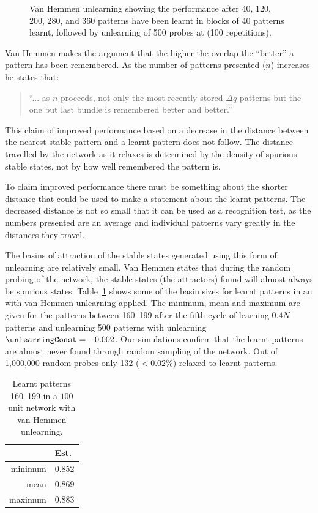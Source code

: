 \begin{figure}[tbp]
\small
\center
	
	\caption{Van Hemmen unlearning showing the performance after 40, 120, 200, 280, and 360 patterns have been learnt in blocks of 40 patterns learnt, followed by unlearning of 500 probes at  (100 repetitions).}
	\label{fig:VanHemmenUL}
\end{figure}

Van Hemmen makes the argument that the higher the overlap the ``better'' a pattern has been remembered.  As the number of patterns presented ($n$) increases he states that:
\begin{quote}
``... as $n$ proceeds, not only the most recently stored $\Delta{q}$ patterns but the one but last bundle is remembered better and better.''
\end{quote}
This claim of improved performance based on a decrease in the distance between the nearest stable pattern and a learnt pattern does not follow.  The distance travelled by the network as it relaxes is determined by the density of spurious stable states, not by how well remembered the pattern is.  

To claim improved performance there must be something about the shorter distance that could be used to make a statement about the learnt patterns.  The decreased distance is not so small that it can be used as a recognition test, as the numbers presented are an average and individual patterns vary greatly in the distances they travel.  

The basins of attraction of the stable states generated using this form of unlearning are relatively small. Van Hemmen states that during the random probing of the network, the stable states (the attractors) found will almost always be spurious states. Table~\ref{tab:vanHemmenBasin} shows some of the basin sizes for learnt patterns in an \hopnet{100\pm}{} with van Hemmen unlearning applied.  The minimum, mean and maximum are given for the patterns between 160--199 after the fifth cycle of learning $0.4N$ patterns and unlearning 500 patterns with unlearning $\unlearningConst = -0.002$. Our simulations confirm that the learnt patterns are almost never found through random sampling of the network. Out of 1,000,000 random probes only 132 ($<0.02\%$) relaxed to learnt patterns.

\begin{table}[hbtp]
	\begin{center}
		\begin{tabular}{r|l}
			& Est. \overlap\\
			\hline
			minimum & 0.852\\
			mean & 0.869\\
			maximum &0.883
		\end{tabular} 
	\end{center}
	\caption{Learnt patterns 160--199 in a $100$ unit network \hopnet{100\pm}{} with van Hemmen unlearning.  }
	\label{tab:vanHemmenBasin}
\end{table}

